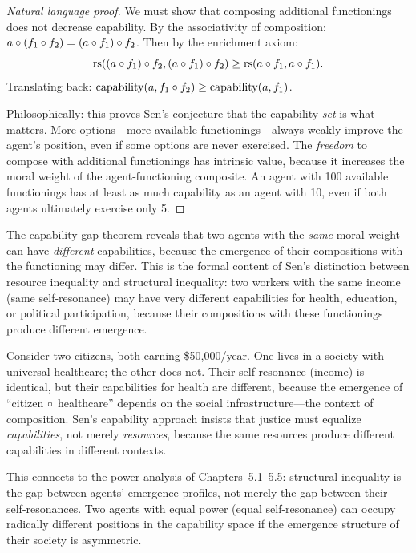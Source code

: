 \begin{proof}[Natural language proof]
We must show that composing additional functionings does not decrease
capability. By the associativity of composition:
$a \circ (f_1 \circ f_2) = (a \circ f_1) \circ f_2$. Then
by the enrichment axiom:
\[
  \mathrm{rs}((a \circ f_1) \circ f_2, (a \circ f_1) \circ f_2)
  \geq \mathrm{rs}(a \circ f_1, a \circ f_1).
\]
Translating back: $\mathrm{capability}(a, f_1 \circ f_2) \geq
\mathrm{capability}(a, f_1)$.

Philosophically: this proves Sen's conjecture that the capability
\emph{set} is what matters. More options---more available functionings---always
weakly improve the agent's position, even if some options are never exercised.
The \emph{freedom} to compose with additional functionings has intrinsic value,
because it increases the moral weight of the agent-functioning composite.
An agent with 100 available functionings has at least as much capability
as an agent with 10, even if both agents ultimately exercise only 5.
\end{proof}

\begin{interpretation}
The capability gap theorem reveals that two agents with the \emph{same}
moral weight can have \emph{different} capabilities, because the emergence
of their compositions with the functioning may differ. This is the formal
content of Sen's distinction between resource inequality and structural
inequality: two workers with the same income (same self-resonance) may
have very different capabilities for health, education, or political
participation, because their compositions with these functionings produce
different emergence.

Consider two citizens, both earning \$50,000/year. One lives in a society
with universal healthcare; the other does not. Their self-resonance (income)
is identical, but their capabilities for health are different, because the
emergence of ``citizen $\circ$ healthcare'' depends on the social
infrastructure---the context of composition. Sen's capability approach
insists that justice must equalize \emph{capabilities}, not merely
\emph{resources}, because the same resources produce different capabilities
in different contexts.

This connects to the power analysis of Chapters~5.1--5.5: structural
inequality is the gap between agents' emergence profiles, not merely
the gap between their self-resonances. Two agents with equal power
(equal self-resonance) can occupy radically different positions in the
capability space if the emergence structure of their society is asymmetric.
\end{interpretation}

